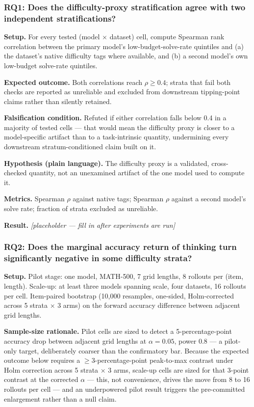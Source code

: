 \documentclass[11pt]{article}
\newcommand{\ph}{\textit{[placeholder --- fill in after experiments are run]}}
\begin{document}
\subsubsection{RQ1: Does the difficulty-proxy stratification agree with two independent stratifications?}
\textbf{Setup.} For every tested (model $\times$ dataset) cell, compute Spearman rank correlation between the primary model's low-budget-solve-rate quintiles and (a) the dataset's native difficulty tags where available, and (b) a second model's own low-budget solve-rate quintiles.

\textbf{Expected outcome.} Both correlations reach $\rho \geq 0.4$; strata that fail both checks are reported as unreliable and excluded from downstream tipping-point claims rather than silently retained.

\textbf{Falsification condition.} Refuted if either correlation falls below 0.4 in a majority of tested cells --- that would mean the difficulty proxy is closer to a model-specific artifact than to a task-intrinsic quantity, undermining every downstream stratum-conditioned claim built on it.

\textbf{Hypothesis (plain language).} The difficulty proxy is a validated, cross-checked quantity, not an unexamined artifact of the one model used to compute it.

\textbf{Metrics.} Spearman $\rho$ against native tags; Spearman $\rho$ against a second model's solve rate; fraction of strata excluded as unreliable.

\textbf{Result.} \ph

\subsubsection{RQ2: Does the marginal accuracy return of thinking turn significantly negative in some difficulty strata?}
\textbf{Setup.} Pilot stage: one model, MATH-500, 7 grid lengths, 8 rollouts per (item, length). Scale-up: at least three models spanning scale, four datasets, 16 rollouts per cell. Item-paired bootstrap (10,000 resamples, one-sided, Holm-corrected across 5 strata $\times$ 3 arms) on the forward accuracy difference between adjacent grid lengths.

\textbf{Sample-size rationale.} Pilot cells are sized to detect a 5-percentage-point accuracy drop between adjacent grid lengths at $\alpha = 0.05$, power 0.8 --- a pilot-only target, deliberately coarser than the confirmatory bar. Because the expected outcome below requires a $\geq$3-percentage-point peak-to-max contrast under Holm correction across 5 strata $\times$ 3 arms, scale-up cells are sized for that 3-point contrast at the corrected $\alpha$ --- this, not convenience, drives the move from 8 to 16 rollouts per cell --- and an underpowered pilot result triggers the pre-committed enlargement rather than a null claim.
\end{document}
